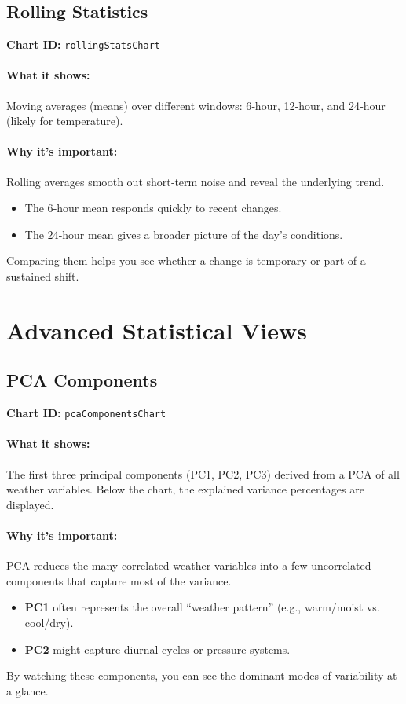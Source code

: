 \documentclass[11pt,a4paper]{article}
\begin{document}
	\subsection{Rolling Statistics}
	\textbf{Chart ID:} \texttt{rollingStatsChart}
	
	\paragraph{What it shows:}
	Moving averages (means) over different windows: 6‑hour, 12‑hour, and 24‑hour (likely for temperature).
	
	\paragraph{Why it’s important:}
	Rolling averages smooth out short‑term noise and reveal the underlying trend.
	\begin{itemize}
		\item The 6‑hour mean responds quickly to recent changes.
		\item The 24‑hour mean gives a broader picture of the day’s conditions.
	\end{itemize}
	Comparing them helps you see whether a change is temporary or part of a sustained shift.
	
	\section{Advanced Statistical Views}
	
	\subsection{PCA Components}
	\textbf{Chart ID:} \texttt{pcaComponentsChart}
	
	\paragraph{What it shows:}
	The first three principal components (PC1, PC2, PC3) derived from a PCA of all weather variables. Below the chart, the explained variance percentages are displayed.
	
	\paragraph{Why it’s important:}
	PCA reduces the many correlated weather variables into a few uncorrelated components that capture most of the variance.
	\begin{itemize}
		\item \textbf{PC1} often represents the overall “weather pattern” (e.g., warm/moist vs. cool/dry).
		\item \textbf{PC2} might capture diurnal cycles or pressure systems.
	\end{itemize}
	By watching these components, you can see the dominant modes of variability at a glance.
	
\end{document}
